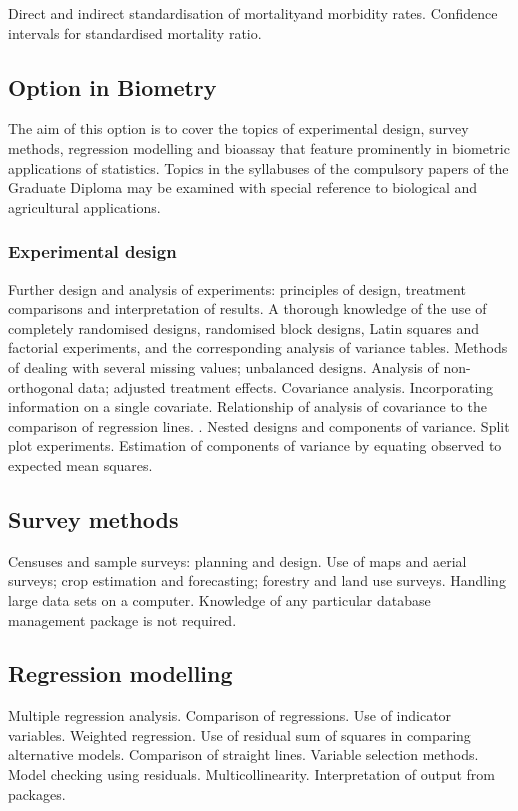 Direct and indirect standardisation of mortalityand morbidity rates. Confidence intervals for
standardised mortality ratio.
 
\subsection*{Option in Biometry}
The aim of this option is to cover the topics of experimental design, survey methods, regression
modelling and bioassay that feature prominently in biometric applications of statistics.
Topics in the syllabuses of the compulsory papers of the Graduate Diploma may be examined with
special reference to biological and agricultural applications.
\subsubsection*{Experimental design}
Further design and analysis of experiments:
principles of design, treatment comparisons and
interpretation of results.
A thorough knowledge of the use of completely
randomised designs, randomised block designs,
Latin squares and factorial experiments, and the
corresponding analysis of variance tables.
Methods of dealing with several missing values;
unbalanced designs.
Analysis of non-orthogonal data; adjusted
treatment effects.
Covariance analysis. Incorporating information on a single covariate.
Relationship of analysis of covariance to the
comparison of regression lines.
.
Nested designs and components of variance. Split
plot experiments.
Estimation of components of variance by equating
observed to expected mean squares.
\subsection*{Survey methods}
Censuses and sample surveys: planning and
design. Use of maps and aerial surveys; crop
estimation and forecasting; forestry and land use
surveys. Handling large data sets on a computer.
Knowledge of any particular database
management package is not required.
\subsection*{Regression modelling}
Multiple regression analysis. Comparison of regressions. Use of indicator variables. Weighted
regression.
Use of residual sum of squares in comparing alternative models. Comparison of straight lines.
Variable selection methods. Model checking using residuals. Multicollinearity. Interpretation
of output from packages.
 
